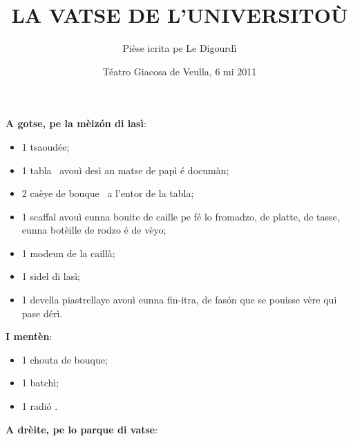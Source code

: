 \title{LA VATSE DE L’UNIVERSITO\`U}
\author{Pièse icrita pe Le Digourdì}
\date{Téatro Giacosa de Veulla, 6 mi 2011}

\maketitle






\Scenographie
\textbf{A gotse, pe la mèiz\'on di lasì}:
\begin{itemize}
\item[$\bullet$] 1 tsaoudée;
\item[$\bullet$] 1 tabla \tabla\ avouì desì an matse de papì é documàn;
\item[$\bullet$] 2 caèye de bouque \sediaLegno\ a l'entor de la tabla;
\item[$\bullet$] 1 scaffal avouì eunna bouite de caille pe fé lo fromadzo, de platte, de tasse, eunna botèille de rodzo é de vèyo;
\item[$\bullet$] 1 modeun de la caillà;
\item[$\bullet$] 1 sidel di lasì;
\item[$\bullet$] 1 devella piastrellaye avouì eunna fin-itra, de fas\'on que se pouisse vère qui pase dérì.
\end{itemize}
\vspace*{0.25cm}

\textbf{I mentèn}:

\begin{itemize}
\item[$\bullet$] 1 chouta de bouque;
\item[$\bullet$] 1 batchì;
\item[$\bullet$] 1 radi\'o \radio .
\end{itemize}
\vspace*{0.25cm}

\textbf{A drèite, pe lo parque di vatse}:

